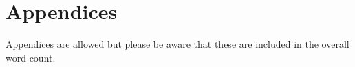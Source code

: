 \documentclass{IET}%
\begin{document}
%
%
%
%
%
%
%
%
%
%
%
\section{Appendices}
%
Appendices are allowed but please be aware that these are included in the overall word count.
\end{document}
